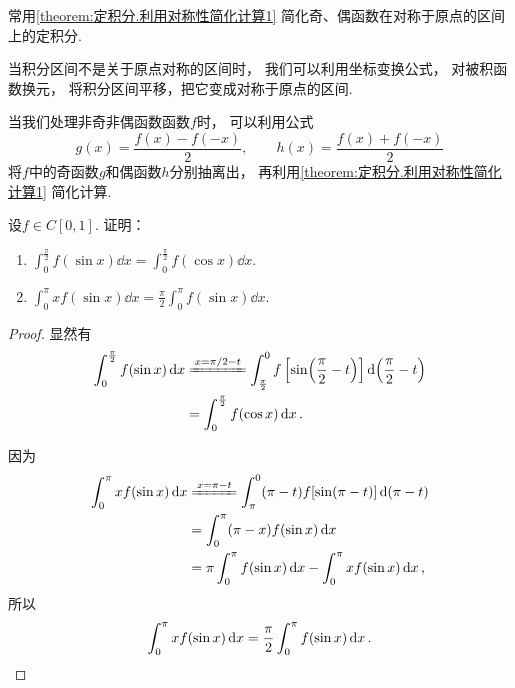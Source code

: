 \begin{remark}
常用\cref{theorem:定积分.利用对称性简化计算1} 简化奇、偶函数在对称于原点的区间上的定积分.

当积分区间不是关于原点对称的区间时，
我们可以利用坐标变换公式，
对被积函数换元，
将积分区间平移，把它变成对称于原点的区间.

当我们处理非奇非偶函数函数\(f\)时，
可以利用公式\[
	g(x) = \frac{f(x) - f(-x)}{2}, \qquad
	h(x) = \frac{f(x) + f(-x)}{2}
\]
将\(f\)中的奇函数\(g\)和偶函数\(h\)分别抽离出，
再利用\cref{theorem:定积分.利用对称性简化计算1} 简化计算.
\end{remark}

\begin{example}
设\(f \in C[0,1]\).
证明：\begin{enumerate}
	\item \(\int_0^{\frac\pi2} f(\sin x) \dd{x}
	= \int_0^{\frac\pi2} f(\cos x) \dd{x}\).

	\item \(\int_0^\pi x f(\sin x) \dd{x}
	= \frac{\pi}{2} \int_0^\pi f(\sin x) \dd{x}\).
\end{enumerate}
\begin{proof}
显然有\begin{align*}
	\int_0^{\frac\pi2} f(\sin x) \dd{x}
	&\xlongequal{x = \pi/2-t}
		\int_{\frac\pi2}^0 f\left[\sin(\frac{\pi}{2}-t)\right] \dd(\frac{\pi}{2}-t) \\
	&= \int_0^{\frac\pi2} f(\cos x) \dd{x}.
\end{align*}

因为\begin{align*}
	\int_0^\pi x f(\sin x) \dd{x}
	&\xlongequal{x = \pi-t}
		\int_{\pi}^0 (\pi-t) f[\sin(\pi-t)] \dd(\pi-t) \\
	&= \int_0^\pi (\pi-x) f(\sin x) \dd{x} \\
	&= \pi \int_0^\pi f(\sin x) \dd{x}
		- \int_0^\pi x f(\sin x) \dd{x},
\end{align*}
所以\[
	\int_0^\pi x f(\sin x) \dd{x}
	= \frac{\pi}{2} \int_0^\pi f(\sin x) \dd{x}.
	\qedhere
\]
\end{proof}
\end{example}

